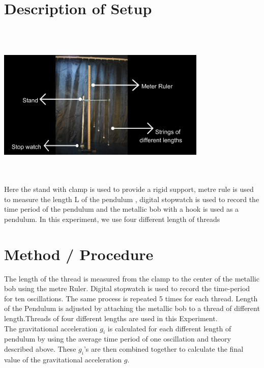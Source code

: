\section{Description of Setup}
\includegraphics[width=10cm, height=8cm]{figures/fig1g.jpeg} \\
Here the stand with clamp is used to provide a rigid support, metre rule is used to measure the length L of the pendulum , digital stopwatch is used to record the time period of the pendulum and the metallic bob with a hook is used as a pendulum. In this experiment, we use four different length of threads


\section{Method / Procedure}

The length of the thread is measured from the clamp to the center of the metallic bob using the metre Ruler. Digital stopwatch is used to record the time-period for ten oscillations. The same process is repeated 5 times for each  thread. Length of the Pendulum is adjusted by attaching the metallic bob to a thread of different length.Threads of four different lengths are used in this Experiment. \\
The gravitational acceleration $g_i$ is calculated for each different length of pendulum by using the average time period of one oscillation and theory described above. These $g_i$'s are then combined together to calculate the final value of the gravitational acceleration $g$.

